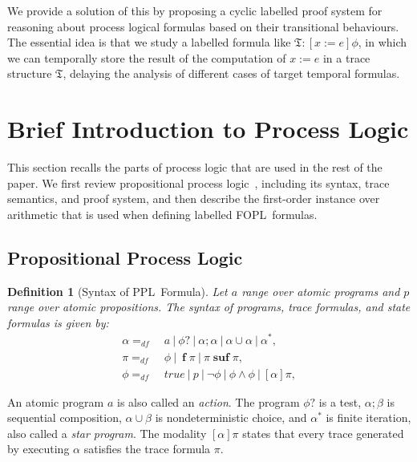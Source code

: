 \documentclass[manuscript,screen]{acmart}
\newtheorem{definition}{Definition}[section]
\newcommand{\mfr}[1]{\mathfrak{#1}}
\newcommand{\dddef}[0]{=_{df}}
\newcommand{\true}[0]{\mathit{true}}
\DeclareMathOperator{\seq}{;}
\DeclareMathOperator{\cho}{\cup}
\DeclareMathOperator{\ofst}{\mathbf{f}}
\DeclareMathOperator{\osuf}{\mathbf{suf}}
\newcommand{\tr}[0]{\mfr{T}}
\newcommand{\PPL}[0]{\mbox{PPL}}
\newcommand{\FOPL}[0]{\mbox{FOPL}}
\begin{document}
We provide a solution of this by proposing a cyclic labelled proof system for reasoning about process logical formulas based on their transitional behaviours. 
The essential idea is that 
we study a labelled formula like $\tr : [x:=e]\phi$, in which we can temporally store the result of the computation of $x := e$ in a trace structure $\tr$, delaying the analysis of different cases of target temporal formulas. 
\fi

\section{Brief Introduction to Process Logic}
\label{section:Brief Introduction to Process Logic}

This section recalls the parts of process logic that are used in the rest of the paper.  We first review propositional process logic~\cite{Harel82}, including its syntax, trace semantics, and proof system, and then describe the first-order instance over arithmetic that is used when defining labelled \FOPL\ formulas.

\subsection{Propositional Process Logic}

\begin{definition}[Syntax of \PPL\ Formula]
\label{def:Syntax of PPL Formula}
    Let $a$ range over atomic programs and $p$ range over atomic propositions.  The syntax of programs, trace formulas, and state formulas is given by:
$$
\begin{aligned}
    \alpha \dddef &\ a\ |\ \phi?\ |\ \alpha\seq \alpha\ |\ \alpha\cho\alpha\ |\ \alpha^*,\\
    \pi \dddef &\ \phi\ |\ \ofst \pi\ |\ \pi\osuf \pi, \\
    \phi\dddef &\ \true\ |\ p\ |\ \neg\phi\ |\ \phi\wedge \phi\ |\ [\alpha]\pi, 
\end{aligned}
$$
\end{definition}

An atomic program $a$ is also called an \emph{action}.  The program $\phi?$ is a test, $\alpha\seq\beta$ is sequential composition, $\alpha\cho\beta$ is nondeterministic choice, and $\alpha^*$ is finite iteration, also called a \emph{star program}.  The modality $[\alpha]\pi$ states that every trace generated by executing $\alpha$ satisfies the trace formula $\pi$.
\end{document}
